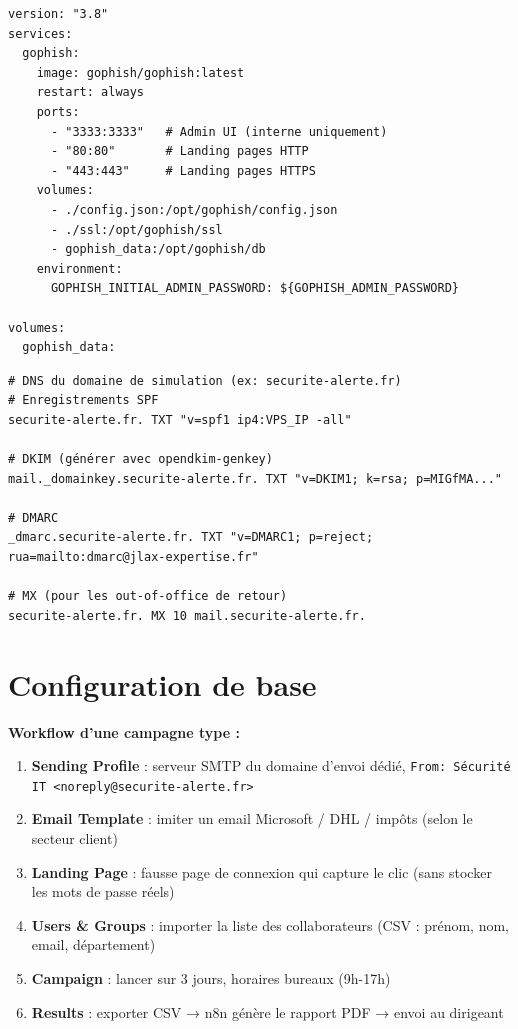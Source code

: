 \documentclass[11pt, a4paper]{article}
\begin{document}
\begin{lstlisting}[style=yamlstyle, caption={docker-compose.yml — GoPhish}]
version: "3.8"
services:
  gophish:
    image: gophish/gophish:latest
    restart: always
    ports:
      - "3333:3333"   # Admin UI (interne uniquement)
      - "80:80"       # Landing pages HTTP
      - "443:443"     # Landing pages HTTPS
    volumes:
      - ./config.json:/opt/gophish/config.json
      - ./ssl:/opt/gophish/ssl
      - gophish_data:/opt/gophish/db
    environment:
      GOPHISH_INITIAL_ADMIN_PASSWORD: ${GOPHISH_ADMIN_PASSWORD}

volumes:
  gophish_data:
\end{lstlisting}

\begin{lstlisting}[style=terminal, caption={Configuration DNS du domaine d'envoi}]
# DNS du domaine de simulation (ex: securite-alerte.fr)
# Enregistrements SPF
securite-alerte.fr. TXT "v=spf1 ip4:VPS_IP -all"

# DKIM (générer avec opendkim-genkey)
mail._domainkey.securite-alerte.fr. TXT "v=DKIM1; k=rsa; p=MIGfMA..."

# DMARC
_dmarc.securite-alerte.fr. TXT "v=DMARC1; p=reject; rua=mailto:dmarc@jlax-expertise.fr"

# MX (pour les out-of-office de retour)
securite-alerte.fr. MX 10 mail.securite-alerte.fr.
\end{lstlisting}

\section{Configuration de base}

\textbf{Workflow d'une campagne type :}
\begin{enumerate}
  \item \textbf{Sending Profile} : serveur SMTP du domaine d'envoi dédié, \texttt{From: Sécurité IT <noreply@securite-alerte.fr>}
  \item \textbf{Email Template} : imiter un email Microsoft / DHL / impôts (selon le secteur client)
  \item \textbf{Landing Page} : fausse page de connexion qui capture le clic (sans stocker les mots de passe réels)
  \item \textbf{Users \& Groups} : importer la liste des collaborateurs (CSV : prénom, nom, email, département)
  \item \textbf{Campaign} : lancer sur 3 jours, horaires bureaux (9h-17h)
  \item \textbf{Results} : exporter CSV → n8n génère le rapport PDF → envoi au dirigeant
\end{enumerate}
\end{document}
